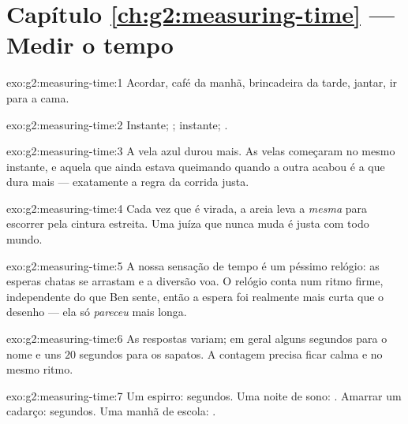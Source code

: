 \section*{Capítulo \ref{ch:g2:measuring-time} --- Medir o tempo}

\begin{solution}{exo:g2:measuring-time:1}
Acordar, café da manhã, brincadeira da tarde, jantar, ir para a cama.
\end{solution}

\begin{solution}{exo:g2:measuring-time:2}
Instante; ; instante; .
\end{solution}

\begin{solution}{exo:g2:measuring-time:3}
A vela azul durou mais. As velas começaram no mesmo instante, e
aquela que ainda estava queimando quando a outra acabou é a que dura
mais --- exatamente a regra da corrida justa.
\end{solution}

\begin{solution}{exo:g2:measuring-time:4}
Cada vez que é virada, a areia leva a \emph{mesma}  para
escorrer pela cintura estreita. Uma juíza que nunca muda é justa com
todo mundo.
\end{solution}

\begin{solution}{exo:g2:measuring-time:5}
A nossa sensação de tempo é um péssimo relógio: as esperas chatas se
arrastam e a diversão voa. O relógio conta num ritmo firme,
independente do que Ben sente, então a espera foi realmente mais
curta que o desenho --- ela só \emph{pareceu} mais longa.
\end{solution}

\begin{solution}{exo:g2:measuring-time:6}
As respostas variam; em geral alguns segundos para o nome e uns $20$
segundos para os sapatos. A contagem precisa ficar calma e no mesmo
ritmo.
\end{solution}

\begin{solution}{exo:g2:measuring-time:7}
Um espirro: segundos. Uma noite de sono: . Amarrar um cadarço:
segundos. Uma manhã de escola: .
\end{solution}

